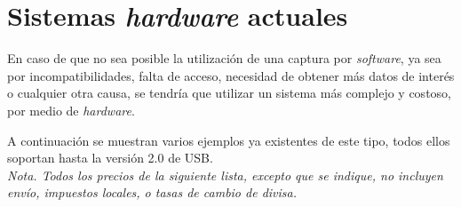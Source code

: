 \section{Sistemas \emph{hardware} actuales}
En caso de que no sea posible la utilización de una captura por \emph{software}, ya sea por incompatibilidades, falta de acceso, necesidad de obtener más datos de interés o cualquier otra causa, se tendría que utilizar un sistema más complejo y costoso, por medio de \emph{hardware}.

A continuación se muestran varios ejemplos ya existentes de este tipo, todos ellos soportan hasta la versión 2.0 de USB. \\

\textit{Nota. Todos los precios de la siguiente lista, excepto que se indique, no incluyen envío, impuestos locales, o tasas de cambio de divisa.}

